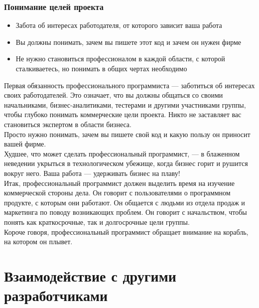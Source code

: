 \documentclass{../industrial-development}
\begin{document}
\begin{frame} \frametitle{Понимание целей проекта}
\begin{itemize}
  \item Забота об интересах работодателя, от которого зависит ваша работа
  \item Вы должны понимать, зачем вы пишете этот код и зачем он нужен фирме
	\item Не нужно становиться профессионалом в каждой области, с которой сталкиваетесь, но понимать в общих чертах необходимо
\end{itemize}
\end{frame}
\lecturenotes
Первая обязанность профессионального программиста — заботиться об интересах своих работодателей. Это означает, что вы должны общаться со своими начальниками, бизнес-аналитиками, тестерами и другими участниками группы, чтобы глубоко понимать коммерческие цели проекта. Никто не заставляет вас становиться экспертом в области бизнеса.\\
Просто нужно понимать, зачем вы пишете свой код и какую пользу он приносит вашей фирме.\\
Худшее, что может сделать профессиональный программист, — в блаженном неведении укрыться в технологическом убежище, когда бизнес горит и рушится вокруг него. Ваша работа — удерживать бизнес на плаву!\\
Итак, профессиональный программист должен выделить время на изучение коммерческой стороны дела. Он говорит с пользователями о программном продукте, с которым они работают. Он общается с людьми из отдела продаж и маркетинга по поводу возникающих проблем. Он говорит с начальством, чтобы понять как краткосрочные, так и долгосрочные цели группы.\\
Короче говоря, профессиональный программист обращает внимание на корабль, на котором он плывет.

\section{Взаимодействие с другими разработчиками}
\end{document}
